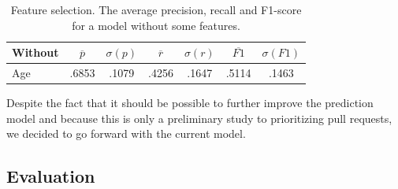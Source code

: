\begin{table}
  \begin{tabular}{ l | c | c | c | c | c | c }
    Without & $\overline{p}$ & $\sigma(p)$ & $\overline{r}$ & $\sigma(r)$ & $\overline{F1}$ & $\sigma(F1)$ \\ \hline
    \hline
    Age & .6853 & .1079 & .4256 & .1647 & .5114 & .1463 \\
  \end{tabular}
  \caption[Feature selection]{Feature selection. The average precision, recall and F1-score for a model without some features. }
  \label{tab:feature-selection}
\end{table}

Despite the fact that it should be possible to further improve the prediction model and because this is only a preliminary study to prioritizing pull requests, we decided to go forward with the current model.

\subsection{Evaluation}
\label{sec:evaluation}

